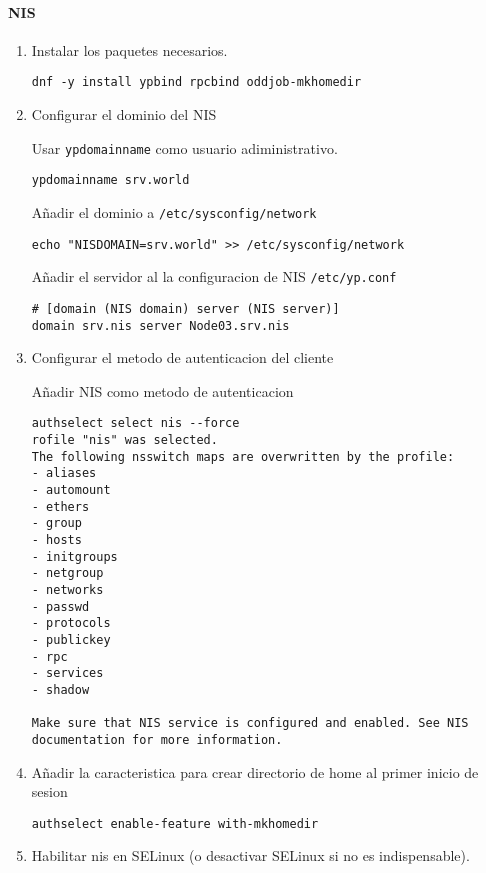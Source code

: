 \documentclass[../main.tex]{subfiles}
\begin{document}
\paragraph{NIS}
\begin{enumerate}
\item Instalar los paquetes necesarios.
  \begin{lstlisting}
dnf -y install ypbind rpcbind oddjob-mkhomedir
\end{lstlisting}

\item Configurar el dominio del NIS

  Usar \lstinline|ypdomainname| como usuario adiministrativo.
  \begin{lstlisting}
ypdomainname srv.world
\end{lstlisting}
  Añadir el dominio a \lstinline|/etc/sysconfig/network|
  \begin{lstlisting}
echo "NISDOMAIN=srv.world" >> /etc/sysconfig/network 
\end{lstlisting}
  Añadir el servidor al la configuracion de NIS \lstinline|/etc/yp.conf|
  \begin{lstlisting}
# [domain (NIS domain) server (NIS server)]
domain srv.nis server Node03.srv.nis 
\end{lstlisting}
     
\item Configurar el metodo de autenticacion del cliente
 
  Añadir NIS como metodo de autenticacion

  \begin{lstlisting}
authselect select nis --force
rofile "nis" was selected.
The following nsswitch maps are overwritten by the profile:
- aliases
- automount
- ethers
- group
- hosts
- initgroups
- netgroup
- networks
- passwd
- protocols
- publickey
- rpc
- services
- shadow

Make sure that NIS service is configured and enabled. See NIS documentation for more information.
\end{lstlisting}

\item Añadir la caracteristica para crear directorio de home al
  primer inicio de sesion

  \begin{lstlisting}
authselect enable-feature with-mkhomedir   
\end{lstlisting}

\item Habilitar nis en SELinux (o desactivar SELinux si no es indispensable).
  

\end{enumerate}
\end{document}
